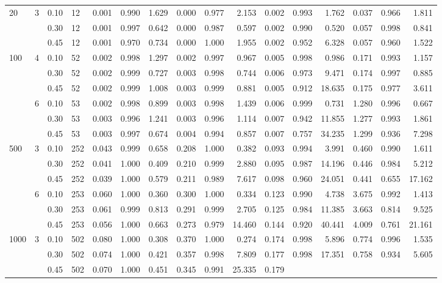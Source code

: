 \documentclass[thesis=B,english]{FITthesis}[2012/10/20]
\begin{document}
\begin{table}[h!]
\begin{adjustbox}{angle=90}
{\begin{tabular}{ll|l|l|r|r|r|r|r|r|r|r|r|r|r|r|}
                         20   & 3 & 0.10 & 12  &    0.001 &  0.990 &  1.629 &   0.000 &  0.977 &   2.153 &  0.002 &  0.993 &   1.762 &  0.037 &  0.966 &   1.811 \\     &   & 0.30 & 12  &    0.001 &  0.997 &  0.642 &   0.000 &  0.987 &   0.597 &  0.002 &  0.990 &   0.520 &  0.057 &  0.998 &   0.841 \\     &   & 0.45 & 12  &    0.001 &  0.970 &  0.734 &   0.000 &  1.000 &   1.955 &  0.002 &  0.952 &   6.328 &  0.057 &  0.960 &   1.522 \\100  & 4 & 0.10 & 52  &    0.002 &  0.998 &  1.297 &   0.002 &  0.997 &   0.967 &  0.005 &  0.998 &   0.986 &  0.171 &  0.993 &   1.157 \\     &   & 0.30 & 52  &    0.002 &  0.999 &  0.727 &   0.003 &  0.998 &   0.744 &  0.006 &  0.973 &   9.471 &  0.174 &  0.997 &   0.885 \\     &   & 0.45 & 52  &    0.002 &  0.999 &  1.008 &   0.003 &  0.999 &   0.881 &  0.005 &  0.912 &  18.635 &  0.175 &  0.977 &   3.611 \\     & 6 & 0.10 & 53  &    0.002 &  0.998 &  0.899 &   0.003 &  0.998 &   1.439 &  0.006 &  0.999 &   0.731 &  1.280 &  0.996 &   0.667 \\     &   & 0.30 & 53  &    0.003 &  0.996 &  1.241 &   0.003 &  0.996 &   1.114 &  0.007 &  0.942 &  11.855 &  1.277 &  0.993 &   1.861 \\     &   & 0.45 & 53  &    0.003 &  0.997 &  0.674 &   0.004 &  0.994 &   0.857 &  0.007 &  0.757 &  34.235 &  1.299 &  0.936 &   7.298 \\500  & 3 & 0.10 & 252 &    0.043 &  0.999 &  0.658 &   0.208 &  1.000 &   0.382 &  0.093 &  0.994 &   3.991 &  0.460 &  0.990 &   1.611 \\     &   & 0.30 & 252 &    0.041 &  1.000 &  0.409 &   0.210 &  0.999 &   2.880 &  0.095 &  0.987 &  14.196 &  0.446 &  0.984 &   5.212 \\     &   & 0.45 & 252 &    0.039 &  1.000 &  0.579 &   0.211 &  0.989 &   7.617 &  0.098 &  0.960 &  24.051 &  0.441 &  0.655 &  17.162 \\     & 6 & 0.10 & 253 &    0.060 &  1.000 &  0.360 &   0.300 &  1.000 &   0.334 &  0.123 &  0.990 &   4.738 &  3.675 &  0.992 &   1.413 \\     &   & 0.30 & 253 &    0.061 &  0.999 &  0.813 &   0.291 &  0.999 &   2.705 &  0.125 &  0.984 &  11.385 &  3.663 &  0.814 &   9.525 \\     &   & 0.45 & 253 &    0.056 &  1.000 &  0.663 &   0.273 &  0.979 &  14.460 &  0.144 &  0.920 &  40.441 &  4.009 &  0.761 &  21.161 \\1000 & 3 & 0.10 & 502 &    0.080 &  1.000 &  0.308 &   0.370 &  1.000 &   0.274 &  0.174 &  0.998 &   5.896 &  0.774 &  0.996 &   1.535 \\     &   & 0.30 & 502 &    0.074 &  1.000 &  0.421 &   0.357 &  0.998 &   7.809 &  0.177 &  0.998 &  17.351 &  0.758 &  0.934 &   5.605 \\     &   & 0.45 & 502 &    0.070 &  1.000 &  0.451 &   0.345 &  0.991 &  25.335 &  0.179 & 
\end{tabular}}
\end{adjustbox}
\end{table}
\end{document}

